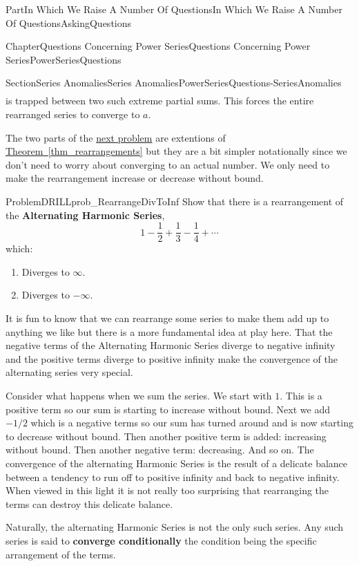 \documentclass[oneside,10pt,]{book}
\newcommand{\xreffont}{\relax}
\newcommand{\terminology}[1]{\textbf{#1}}
\numberwithin{equation}{part}
\begin{document}
\begin{partptx}{Part}{In Which We Raise A Number Of Questions}{}{In Which We Raise A Number Of Questions}{}{}{AskingQuestions}
\begin{chapterptx}{Chapter}{Questions Concerning Power Series}{}{Questions Concerning Power Series}{}{}{PowerSeriesQuestions}
\begin{sectionptx}{Section}{Series Anomalies}{}{Series Anomalies}{}{}{PowerSeriesQuestions-SeriesAnomalies}
\begin{align*}
\end{align*}
is trapped between two such extreme partial sums. This forces the entire rearranged series to converge to \(a\).%
\par
The two parts of the \hyperref[DRILLprob_RearrangeDivToInf]{next problem} are extentions of \hyperref[thm_rearrangements]{Theorem~{\xreffont\ref{thm_rearrangements}}} but they are a bit simpler notationally since we don't need to worry about converging to an actual number.  We only need to make the rearrangement increase or decrease without bound.%
\begin{problem}{Problem}{}{DRILLprob_RearrangeDivToInf}%
Show that there is a rearrangement of the \terminology{Alternating Harmonic Series},%
\begin{equation*}
1-\frac{1}{2}+\frac{1}{3}-\frac{1}{4}+\cdots
\end{equation*}
which:%
\begin{enumerate}[font=\bfseries,label=(\alph*),ref=\alph*]%
\item{}Diverges to \(\infty\).%
\item{}Diverges to \(-\infty\).%
\end{enumerate}%
\end{problem}
It is fun to know that we can rearrange some series to make them add up to anything we like but there is a more fundamental idea at play here.  That the negative terms of the Alternating Harmonic Series diverge to negative infinity and the positive terms diverge to positive infinity make the convergence of the alternating series very special.%
\par
Consider what happens when we sum the series.  We start with \(1\). This is a positive term so our sum is starting to increase without bound.  Next we add \(-1/2\) which is a negative terms so our sum has turned around and is now starting to decrease without bound.  Then another positive term is added: increasing without bound.  Then another negative term: decreasing.  And so on.  The convergence of the alternating Harmonic Series is the result of a delicate balance between a tendency to run off to positive infinity and back to negative infinity.  When viewed in this light it is not really too surprising that rearranging the terms can destroy this delicate balance.%
\par
Naturally, the alternating Harmonic Series is not the only such series. Any such series is said to \terminology{converge conditionally} \textemdash{} the condition being the specific arrangement of the terms.%
\par

\end{sectionptx}
\end{chapterptx}
\end{partptx}
\end{document}
